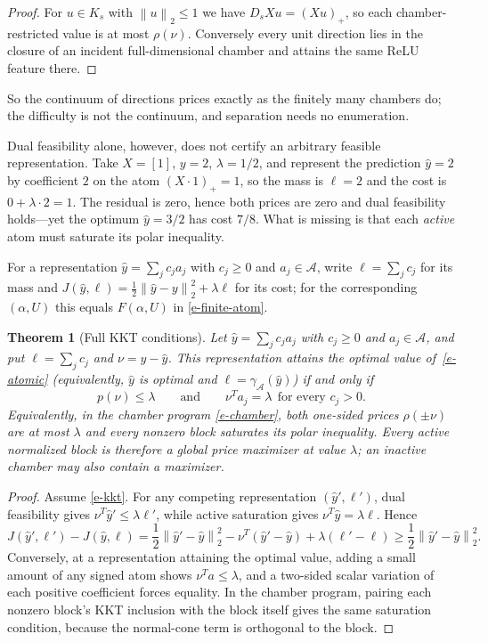 \documentclass[12pt]{article}
\theoremstyle{plain}
\newtheorem{theorem}{Theorem}
\theoremstyle{definition}
\newcommand{\A}{\mathcal{A}}
\newcommand{\norm}[1]{\left\lVert #1\right\rVert}
\newcommand{\relu}[1]{\left(#1\right)_+}
\newcommand{\yhat}{\widehat y}
\begin{document}
\begin{proof}
For $u\in K_s$ with $\norm u_2\le1$ we have $D_sXu=\relu{Xu}$, so each
chamber-restricted value is at most $\rho(\nu)$. Conversely every unit
direction lies in the closure of an incident full-dimensional chamber and
attains the same ReLU feature there.
\end{proof}

So the continuum of directions prices exactly as the finitely many chambers
do; the difficulty is not the continuum, and separation needs no enumeration.

Dual feasibility alone, however, does not certify an arbitrary feasible
representation. Take $X=[1]$, $y=2$, $\lambda=1/2$, and represent the
prediction $\yhat=2$ by coefficient $2$ on the atom $\relu{X\cdot1}=1$, so the
mass is $\ell=2$ and the cost is $0+\lambda\cdot2=1$. The residual is zero,
hence both prices are zero and dual feasibility holds---yet the optimum
$\yhat=3/2$ has cost $7/8$. What is missing is that each \emph{active} atom
must saturate its polar inequality.

For a representation $\yhat=\sum_jc_ja_j$ with $c_j\ge0$ and $a_j\in\A$, write
$\ell=\sum_jc_j$ for its mass and
$J(\yhat,\ell)=\tfrac12\norm{\yhat-y}_2^2+\lambda\ell$ for its cost; for the
corresponding $(\alpha,U)$ this equals $F(\alpha,U)$ in
\eqref{e-finite-atom}.

\begin{theorem}[Full KKT conditions]\label{t-kkt}
Let $\yhat=\sum_jc_ja_j$ with $c_j\ge0$ and $a_j\in\A$, and put
$\ell=\sum_jc_j$ and $\nu=y-\yhat$. This representation attains the optimal
value of~\eqref{e-atomic} (equivalently, $\yhat$ is optimal and
$\ell=\gamma_{\A}(\yhat)$) if and only if
\begin{equation}\label{e-kkt}
  p(\nu)\le\lambda
  \qquad\text{and}\qquad
  \nu^Ta_j=\lambda\ \ \text{for every }c_j>0 .
\end{equation}
Equivalently, in the chamber program \eqref{e-chamber}, both one-sided prices
$\rho(\pm\nu)$ are at most $\lambda$ and every nonzero block saturates its polar inequality.
Every active normalized block is therefore a global price maximizer at value
$\lambda$; an inactive chamber may also contain a maximizer.
\end{theorem}

\begin{proof}
Assume \eqref{e-kkt}. For any competing representation $(\yhat',\ell')$, dual
feasibility gives $\nu^T\yhat'\le\lambda\ell'$, while active saturation gives
$\nu^T\yhat=\lambda\ell$. Hence
\[
 J(\yhat',\ell')-J(\yhat,\ell)
 =\frac12\norm{\yhat'-\yhat}_2^2-\nu^T(\yhat'-\yhat)+\lambda(\ell'-\ell)
 \ge\frac12\norm{\yhat'-\yhat}_2^2 .
\]
Conversely, at a representation attaining the optimal value, adding a small
amount of any signed atom shows $\nu^Ta\le\lambda$, and a two-sided scalar
variation of each positive coefficient forces equality. In the chamber
program, pairing each nonzero block's KKT inclusion with the block itself
gives the same saturation condition, because the normal-cone term is
orthogonal to the block.
\end{proof}
\end{document}

